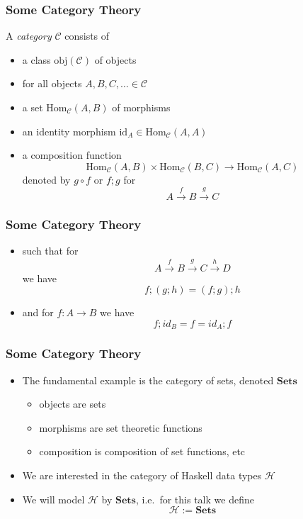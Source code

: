 \documentclass[xcolor=pdftex,dvipsnames,table]{beamer}
\newcommand{\C}{\ensuremath{\mathcal{C}}}
\newcommand{\typ}{\ensuremath{\mathcal{H}}}
\newcommand{\SET}{\ensuremath{\mathbf{Sets}}}
\newcommand{\Hom}{\ensuremath{\mathrm{Hom}}}
\newcommand{\hili}[1]{\emph{\textcolor{title}{#1}}}
\begin{document}
\begin{frame}
    \frametitle{Some Category Theory}
    A \hili{category} \C{} consists of \pause
    \begin{itemize}
        \item a class $\mathrm{obj}(\C)$ of objects \pause
        \item for all objects $A,B,C,\ldots\in \C$ \pause
        \item a set $\Hom_\C(A,B)$ of morphisms \pause
        \item an identity morphism $\mathrm{id}_A \in \Hom_\C(A,A)$ \pause
        \item a composition function \[\Hom_\C(A,B)\times \Hom_\C(B,C)
            \rightarrow \Hom_\C(A,C)\] denoted by $g\circ f$ or $f;g$
            for \[A \xrightarrow{f} B \xrightarrow{g} C\]
    \end{itemize}
\end{frame}

\begin{frame}
    \frametitle{Some Category Theory}
    \begin{itemize}
        \item such that for \[A \xrightarrow{f} B \xrightarrow{g} C
            \xrightarrow{h} D\] we have \[f;(g;h) = (f;g);h\] \pause
        \item and for $f : A \rightarrow B$ we have \[f;id_B = f = id_A;f\]
    \end{itemize}
\end{frame}

\begin{frame}
    \frametitle{Some Category Theory}
    \begin{itemize}
        \item The fundamental example is the category
            of sets, denoted \SET{}
        \begin{itemize}
            \item objects are sets
            \item morphisms are set theoretic functions
            \item composition is composition of set functions, etc
        \end{itemize} \pause
        \item We are interested in the category of Haskell data types
            \typ{}\pause
        \item We will model \typ{} by \SET{}, i.e.~for this talk we
            define \[\typ{} := \SET{}\]
    \end{itemize}
\end{frame}
\end{document}

